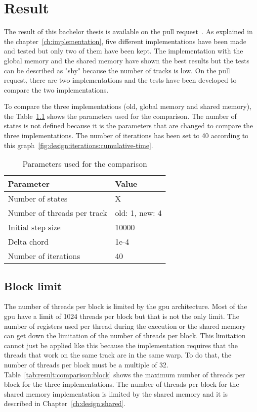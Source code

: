 \chapter{Result}
\label{ch:result}

The result of this bachelor thesis is available on the pull request~\cite{pull-request-barras}.
As explained in the chapter~\ref{ch:implementation}, five different
implementations have been made and tested but only two of them have been kept.
The implementation with the global memory and the shared memory have shown the
best results but the tests can be described as "shy" because the number of
tracks is low.
On the pull request, there are two implementations and the tests have been
developed to compare the two implementations.

To compare the three implementations (old, global memory and shared memory), the
Table~\ref{tab:result:comparison:parameters} shows the parameters used for the
comparison.
The number of states is not defined because it is the parameters that are changed
to compare the three implementations.
The number of iterations has been set to 40 according to this
graph~\ref{fig:design:iterations:cumulative-time}.

\begin{table}[ht]
    \centering
    \begin{tabular}{|l|l|}
        \hline
        \textbf{Parameter} & \textbf{Value} \\
        \hline
        Number of states & X \\
        \hline
        Number of threads per track & old: 1, new: 4 \\
        \hline
        Initial step size & 10000 \\
        \hline
        Delta chord & 1e-4 \\
        \hline
        Number of iterations & 40 \\
        \hline
    \end{tabular}
    \caption{Parameters used for the comparison}
    \label{tab:result:comparison:parameters}
\end{table}

\section{Block limit}
\label{ch:result:comparison:block}

The number of threads per block is limited by the \acrshort{gpu} architecture.
Most of the \acrshort{gpu} have a limit of 1024 threads per block but that is
not the only limit.
The number of registers used per thread during the execution or the shared memory
can get down the limitation of the number of threads per block.
This limitation cannot just be applied like this because the implementation
requires that the threads that work on the same track are in the same warp.
To do that, the number of threads per block must be a multiple of 32.
Table~\ref{tab:result:comparison:block} shows the maximum number of threads per
block for the three implementations.
The number of threads per block for the shared memory implementation is limited
by the shared memory and it is described in Chapter~\ref{ch:design:shared}.

